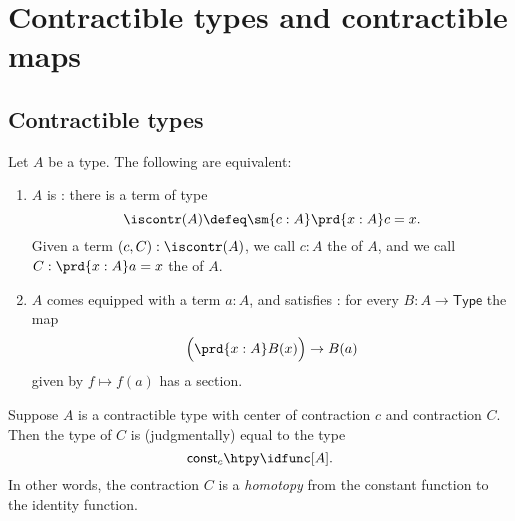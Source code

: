 \chapter{Contractible types and contractible maps}

\section{Contractible types}

\begin{thm}\label{thm:contractible}
Let $A$ be a type. The following are equivalent:
\begin{enumerate}
\item $A$ is : there is a term of type
\begin{equation*}
\iscontr(A) \defeq \sm{c:A}\prd{x:A}c=x.
\end{equation*}
Given a term $(c,C):\iscontr(A)$, we call $c:A$ the  of $A$, and we call $C:\prd{x:A}a=x$ the  of $A$.
\item $A$ comes equipped with a term $a:A$, and satisfies : for every $B:A\to\mathsf{Type}$ the map
\begin{equation*}
\Big(\prd{x:A}B(x)\Big)\to B(a)
\end{equation*}
given by $f\mapsto f(a)$ has a section.
\end{enumerate}
\end{thm}

\begin{rmk}
Suppose $A$ is a contractible type with center of contraction $c$ and contraction $C$. Then the type of $C$ is (judgmentally) equal to the type
\begin{equation*}
\mathsf{const}_c\htpy\idfunc[A].
\end{equation*}
In other words, the contraction $C$ is a \emph{homotopy} from the constant function to the identity function.
\end{rmk}

